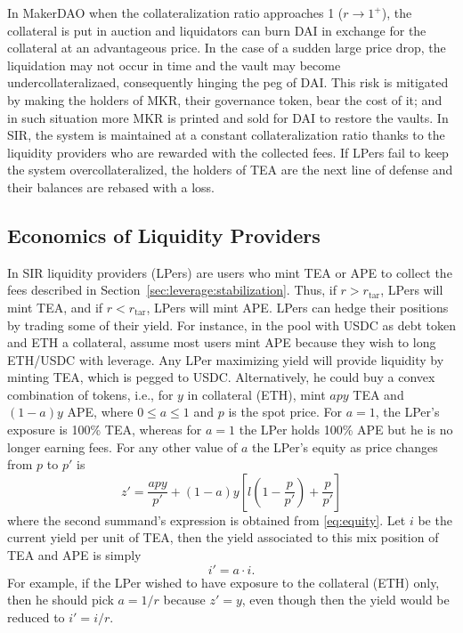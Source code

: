 \documentclass[journal,letterpaper,oneside,onecolumn,12pt]{IEEEtran}
\begin{document}
	
	In MakerDAO when the collateralization ratio approaches 1 ($r\rightarrow1^+$), the collateral is put in auction and liquidators can burn DAI in exchange for the collateral at an advantageous price. In the case of a sudden large price drop, the liquidation may not occur in time and the vault may become undercollateralizaed, consequently hinging the peg of DAI. This risk is mitigated by making the holders of MKR, their governance token, bear the cost of it; and in such situation more MKR is printed and sold for DAI to restore the vaults.
	In SIR, the system is maintained at a constant collateralization ratio thanks to the liquidity providers who are rewarded with the collected fees. If LPers fail to keep the system overcollateralized, the holders of TEA are the next line of defense and their balances are rebased with a loss.
	
	
	
	\subsection{Economics of Liquidity Providers}
	
	In SIR liquidity providers (LPers) are users who mint TEA or APE to collect the fees described in Section~\ref{sec:leverage:stabilization}. Thus, if $r>r_\textrm{tar}$, LPers will mint TEA, and if $r<r_\textrm{tar}$, LPers will mint APE. 	
	LPers can hedge their positions by trading some of their yield. For instance, in the pool with USDC as debt token and ETH a collateral, assume most users mint APE because they wish to long ETH/USDC with leverage. Any LPer maximizing yield will provide liquidity by minting TEA, which is pegged to USDC. Alternatively, he could buy a convex combination of tokens, i.e., for $y$ in collateral (ETH), mint $apy$ TEA and $(1-a)y$ APE, where $0\leq a\leq1$ and $p$ is the spot price. For $a=1$, the LPer's exposure is 100\% TEA, whereas for $a=1$ the LPer holds 100\% APE but he is no longer earning fees. For any other value of $a$ the LPer's equity as price changes from $p$ to $p'$ is
	\begin{equation}
		z' = \frac{apy}{p'}+(1-a)y\left[l\left(1-\frac{p}{p'}\right)+\frac{p}{p'}\right]
	\end{equation}
	where the second summand's expression is obtained from \eqref{eq:equity}. Let $i$ be the current yield per unit of TEA, then the yield associated to this mix position of TEA and APE is simply
	\begin{equation}
		i' = a\cdot i.
	\end{equation}
	For example, if the LPer wished to have exposure to the collateral (ETH) only, then he should pick $a=1/r$ because $z'=y$, even though then the yield would be reduced to $i'=i/r$.
	
\end{document}

